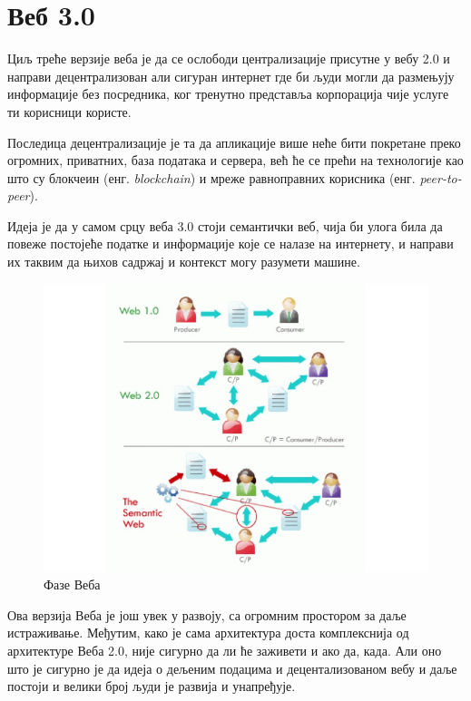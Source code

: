 \documentclass[12pt,oneside]{memoir}
\begin{document}
\section{Веб 3.0}
\label{sec:sem_veb_veb_3}

Циљ треће верзије веба је да се ослободи централизације присутне у вебу 2.0 и направи децентрализован али сигуран интернет где би људи могли да размењују информације без посредника, ког тренутно представља корпорација чије услуге ти корисници користе.

Последица децентрализације је та да апликације више неће бити покретане преко огромних, приватних, база података и сервера, већ ће се прећи на технологије као што су блокчеин (енг. \textit{blockchain}) и мреже равноправних корисника (енг. \textit{peer-to-peer}).

Идеја је да у самом срцу веба 3.0 стоји семантички веб, чија би улога била да повеже постојеће податке и информације које се налазе на интернету, и направи их таквим да њихов садржај и контекст могу разумети машине.

\begin{figure}[!ht]
  \centering
  \includegraphics[width=1\textwidth]{pictures/webs_vrs.jpg}
  \caption{Фазе Веба}
  \label{fig:sem_veb_versions}
\end{figure}

Ова верзија Веба је још увек у развоју, са огромним простором за даље истраживање. Међутим, како је сама архитектура доста комплекснија од архитектуре Веба 2.0, није сигурно да ли ће заживети и ако да, када. Али оно што је сигурно је да идеја о дељеним подацима и децентализованом вебу и даље постоји и велики број људи је развија и унапређује.
\end{document}
